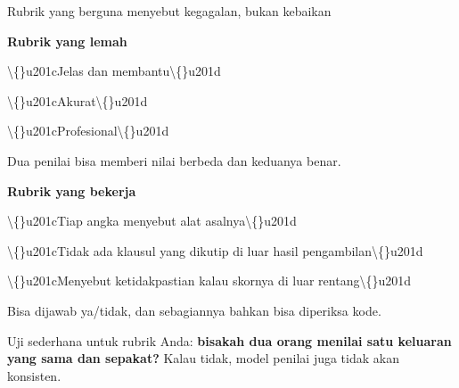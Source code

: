 \documentclass[aspectratio=169,11pt,t]{beamer}
\begin{document}
\begin{frame}[shrink=25]{Rubrik yang berguna menyebut kegagalan, bukan kebaikan}
\begin{minipage}[t]{0.485\textwidth}
{\fontsize{9.4}{12.6}\selectfont\color{fg2}\textbf{Rubrik yang lemah}\par}\vskip 4pt
\begin{ibullets}
\item \textbackslash\{\}u201cJelas dan membantu\textbackslash\{\}u201d
\item \textbackslash\{\}u201cAkurat\textbackslash\{\}u201d
\item \textbackslash\{\}u201cProfesional\textbackslash\{\}u201d
\end{ibullets}
{\fontsize{9.4}{12.6}\selectfont\color{fg2}Dua penilai bisa memberi nilai berbeda dan keduanya benar.\par}\vskip 4pt

\end{minipage}%
\hfill
\begin{minipage}[t]{0.485\textwidth}
{\fontsize{9.4}{12.6}\selectfont\color{fg2}\textbf{Rubrik yang bekerja}\par}\vskip 4pt
\begin{ibullets}
\item \textbackslash\{\}u201cTiap angka menyebut alat asalnya\textbackslash\{\}u201d
\item \textbackslash\{\}u201cTidak ada klausul yang dikutip di luar hasil pengambilan\textbackslash\{\}u201d
\item \textbackslash\{\}u201cMenyebut ketidakpastian kalau skornya di luar rentang\textbackslash\{\}u201d
\end{ibullets}
{\fontsize{9.4}{12.6}\selectfont\color{fg2}Bisa dijawab ya/tidak, dan sebagiannya bahkan bisa diperiksa kode.\par}\vskip 4pt

\end{minipage}%
\begin{iband}[signal]
Uji sederhana untuk rubrik Anda: \textbf{bisakah dua orang menilai satu keluaran yang sama dan sepakat?} Kalau tidak, model penilai juga tidak akan konsisten.
\end{iband}
\end{frame}

\end{document}
